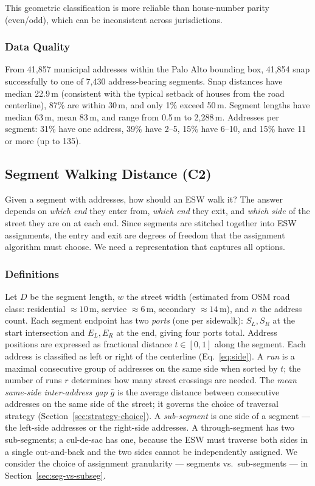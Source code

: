 \documentclass[conference]{IEEEtran}
\begin{document}
This geometric classification is more reliable than house-number parity (even/odd), which can be inconsistent across jurisdictions.

\subsubsection{Data Quality}

From 41,857 municipal addresses within the Palo Alto bounding box, 41,854 snap successfully to one of 7,430 address-bearing segments. Snap distances have median 22.9\,m (consistent with the typical setback of houses from the road centerline), 87\% are within 30\,m, and only 1\% exceed 50\,m. Segment lengths have median 63\,m, mean 83\,m, and range from 0.5\,m to 2,288\,m. Addresses per segment: 31\% have one address, 39\% have 2--5, 15\% have 6--10, and 15\% have 11 or more (up to 135).

\subsection{Segment Walking Distance (C2)}
\label{sec:costmatrix}

Given a segment with addresses, how should an ESW walk it? The answer depends on \emph{which end} they enter from, \emph{which end} they exit, and \emph{which side} of the street they are on at each end. Since segments are stitched together into ESW assignments, the entry and exit are degrees of freedom that the assignment algorithm must choose. We need a representation that captures all options.

\subsubsection{Definitions}

Let $D$ be the segment length, $w$ the street width (estimated from OSM road class: residential $\approx 10$\,m, service $\approx 6$\,m, secondary $\approx 14$\,m), and $n$ the address count. Each segment endpoint has two \emph{ports} (one per sidewalk): $S_L, S_R$ at the start intersection and $E_L, E_R$ at the end, giving four ports total. Address positions are expressed as fractional distance $t \in [0,1]$ along the segment. Each address is classified as left or right of the centerline (Eq.~\ref{eq:side}). A \emph{run} is a maximal consecutive group of addresses on the same side when sorted by $t$; the number of runs $r$ determines how many street crossings are needed. The \emph{mean same-side inter-address gap} $\bar{g}$ is the average distance between consecutive addresses on the same side of the street; it governs the choice of traversal strategy (Section~\ref{sec:strategy-choice}). A \emph{sub-segment} is one side of a segment --- the left-side addresses or the right-side addresses. A through-segment has two sub-segments; a cul-de-sac has one, because the ESW must traverse both sides in a single out-and-back and the two sides cannot be independently assigned. We consider the choice of assignment granularity --- segments vs.\ sub-segments --- in Section~\ref{sec:seg-vs-subseg}.
\end{document}

